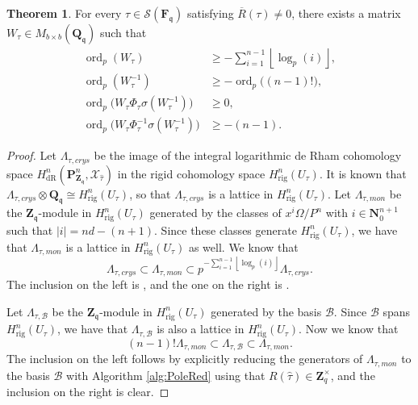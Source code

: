 \documentclass[a4paper,11pt]{article}
\numberwithin{equation}{section}
\providecommand{\abs}[1]{\lvert#1\rvert}                 %
\providecommand{\floor}[1]{\left\lfloor#1\right\rfloor}   %
\newcommand{\NN}{\mathbf{N}} %
\newcommand{\ZZ}{\mathbf{Z}} %
\newcommand{\QQ}{\mathbf{Q}} %
\newcommand{\FF}{\mathbf{F}} %
\DeclareMathOperator{\ord}{ord}          %
\providecommand{\HdR}{H_{\text{dR}}}    %
\providecommand{\Hrig}{H_{\text{rig}}}  %
\providecommand{\cB}{\mathcal{B}} %
\theoremstyle{definition}
\newtheorem{thm}{Theorem}[section]
\begin{document}
\begin{thm} \label{thm:deltabound}
For every 
$\tau \in \mathcal{S}(\FF_{\mathfrak{q}})$ satisfying $\overline{R}(\tau) \neq 0$, there exists a 
matrix $W_{\tau} \in M_{b \times b}(\QQ_{\mathfrak{q}})$ such that 
\begin{align*}
\ord_p(W_{\tau}) & \geq -\sum_{i=1}^{n-1} \floor{\log_p(i)}, \\
\ord_p(W_{\tau}^{-1}) & \geq -\ord_p\bigl((n-1)!\bigr), \\
\ord_p\bigl(W_{\tau} \Phi_{\tau} \sigma(W_{\tau}^{-1})\bigr) & \geq 0, \\
\ord_p\bigl(W_{\tau} \Phi_{\tau}^{-1} \sigma(W_{\tau}^{-1})\bigr) & \geq -(n-1).
\end{align*}
\end{thm}

\begin{proof}
Let $\Lambda_{\tau, crys}$ be the image of the integral logarithmic de Rham cohomology space
$\HdR^n(\mathbf{P}_{\mathbf{Z}_{\mathfrak{q}}}^n,\mathcal{X}_{\hat{\tau}})$ in the rigid cohomology
space $\Hrig^n(U_{\tau})$. It is known that
$\Lambda_{\tau, crys} \otimes \QQ_{\mathfrak{q}} \cong \Hrig^n(U_{\tau})$, so that
$\Lambda_{\tau, crys}$ is a lattice in $\Hrig^n(U_{\tau})$. Let $\Lambda_{\tau, mon}$
be the $\ZZ_{\mathfrak{q}}$-module in $\Hrig^n(U_{\tau})$ generated by the classes
of $x^i \Omega/P^n$ with $i \in \NN_0^{n+1}$ such that $\abs{i}=nd-(n+1)$. Since
these classes generate $\Hrig^n(U_{\tau})$, we have that $\Lambda_{\tau,mon}$ is a 
lattice in $\Hrig^n(U_{\tau})$ as well. We know that
\[
\Lambda_{\tau,crys} \subset \Lambda_{\tau,mon} \subset p^{-\sum_{i=1}^{n-1} \floor{\log_p(i)}} \Lambda_{\tau,crys}.
\]
The inclusion on the left is \cite[Lemma 3.4.3]{AbbottKedlayaRoe2006}, and the one on the right 
is \cite[Proposition 3.4.6]{AbbottKedlayaRoe2006}.

Let $\Lambda_{\tau,\cB}$ be the $\ZZ_{\mathfrak{q}}$-module in $\Hrig^n(U_{\tau})$ generated 
by the basis $\cB$. Since $\cB$ spans $\Hrig^n(U_{\tau})$, we have that $\Lambda_{\tau,\cB}$ is also a 
lattice in $\Hrig^n(U_{\tau})$. Now we know that
\[
(n-1)! \Lambda_{\tau,mon} \subset \Lambda_{\tau,\cB} \subset \Lambda_{\tau,mon}. 
\]
The inclusion on the left follows by explicitly reducing the generators of $\Lambda_{\tau,mon}$ 
to the basis $\cB$ with Algorithm \ref{alg:PoleRed} using that $R(\hat{\tau}) \in \ZZ_q^{\times}$, and
the inclusion on the right is clear.


\end{proof}
\end{document}
